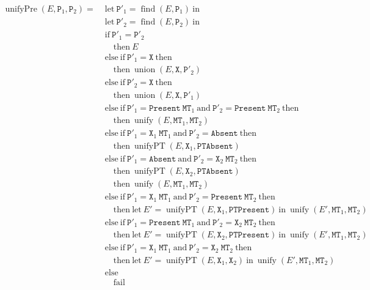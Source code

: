 \documentclass{report}
\newcommand{\code}{\mathtt}
\DeclareMathOperator{\union}{union}
\DeclareMathOperator{\find}{find}
\DeclareMathOperator{\unify}{unify}
\DeclareMathOperator{\unifyPresence}{unifyPre}
\DeclareMathOperator{\unifyPresenceWithType}{unifyPT}
\begin{document}
\begin{align*}
\unifyPresence(E, \code{P}_1, \code{P}_2) = \;
& \text{let}\ \code{P}'_1 = \find(E, \code{P}_1)\ \text{in} \\
& \text{let}\ \code{P}'_2 = \find(E, \code{P}_2)\ \text{in} \\
& \text{if}\ \code{P}'_1 = \code{P}'_2 \\
& \quad \text{then}\ E \\
& \text{else}\ \text{if}\ \code{P}'_1 = \code{X}\ \text{then} \\
& \quad \text{then}\ \union(E, \code{X}, \code{P}'_2) \\
& \text{else}\ \text{if}\ \code{P}'_2 = \code{X}\ \text{then} \\
& \quad \text{then}\ \union(E, \code{X}, \code{P}'_1) \\
& \text{else}\ \text{if}\ \code{P}'_1 = \code{Present}\ \code{MT}_1\ \text{and}\ \code{P}'_2 = \code{Present}\ \code{MT}_2\ \text{then} \\
& \quad \text{then}\ \unify(E, \code{MT}_1, \code{MT}_2) \\
& \text{else}\ \text{if}\ \code{P}'_1 = \code{X}_1\ \code{MT}_1\ \text{and}\ \code{P}'_2 = \code{Absent}\ \text{then} \\
& \quad \text{then}\ \unifyPresenceWithType(E, \code{X}_1, \code{PTAbsent}) \\
& \text{else}\ \text{if}\ \code{P}'_1 = \code{Absent}\ \text{and}\ \code{P}'_2 = \code{X}_2\ \code{MT}_2\ \text{then} \\
& \quad \text{then}\ \unifyPresenceWithType(E, \code{X}_2, \code{PTAbsent}) \\
& \quad \text{then}\ \unify(E, \code{MT}_1, \code{MT}_2) \\
& \text{else}\ \text{if}\ \code{P}'_1 = \code{X}_1\ \code{MT}_1\ \text{and}\ \code{P}'_2 = \code{Present}\ \code{MT}_2\ \text{then} \\
& \quad \text{then}\ \text{let}\ E' = \unifyPresenceWithType(E, \code{X}_1, \code{PTPresent})\ \text{in}\ \unify(E', \code{MT}_1, \code{MT}_2) \\
& \text{else}\ \text{if}\ \code{P}'_1 = \code{Present}\ \code{MT}_1\ \text{and}\ \code{P}'_2 = \code{X}_2\ \code{MT}_2\ \text{then} \\
& \quad \text{then}\ \text{let}\ E' = \unifyPresenceWithType(E, \code{X}_2, \code{PTPresent})\ \text{in}\ \unify(E', \code{MT}_1, \code{MT}_2) \\
& \text{else}\ \text{if}\ \code{P}'_1 = \code{X}_1\ \code{MT}_1\ \text{and}\ \code{P}'_2 = \code{X}_2\ \code{MT}_2\ \text{then} \\
& \quad \text{then}\ \text{let}\ E' = \unifyPresenceWithType(E, \code{X}_1, \code{X}_2)\ \text{in}\ \unify(E', \code{MT}_1, \code{MT}_2) \\
& \text{else} \\
& \quad \text{fail}
\end{align*}
\end{document}
